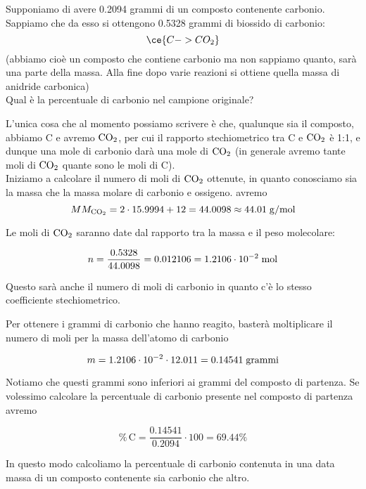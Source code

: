 \begin{esercizio}[$\bigstar$]
    Supponiamo di avere 0.2094 grammi di un composto contenente carbonio. Sappiamo che da esso si ottengono 0.5328 grammi di biossido di carbonio:
    \begin{equation*}
        \ce{C -> CO_2}
    \end{equation*}
    (abbiamo cioè un composto che contiene carbonio ma non sappiamo quanto, sarà una parte della massa. Alla fine dopo varie reazioni si ottiene quella massa di anidride carbonica)\\
    Qual è la percentuale di carbonio nel campione originale?
\end{esercizio}
\begin{soluzione}
    L'unica cosa che al momento possiamo scrivere è che, qualunque sia il composto, abbiamo C e avremo $\rm CO_2$, per cui il rapporto stechiometrico tra C e $\rm CO_2$ è 1:1, e dunque una mole di carbonio darà una mole di $\rm CO_2$ (in generale avremo tante moli di $\rm CO_2$ quante sono le moli di C).\\
    Iniziamo a calcolare il numero di moli di $\rm CO_2$ ottenute, in quanto conosciamo sia la massa che la massa molare di carbonio e ossigeno. avremo
    \begin{equation*}
        MM_{\text{CO}_2}=2 \cdot 15.9994 + 12 = 44.0098 \approx 44.01 \; \rm g/mol
    \end{equation*}

Le moli di $\rm CO_2$ saranno date dal rapporto tra la massa e il peso molecolare:

$$n=\frac{0.5328}{44.0098}=0.012106=1.2106 \cdot 10^{-2} \; \rm mol$$

Questo sarà anche il numero di moli di carbonio in quanto c'è lo stesso coefficiente stechiometrico.

Per ottenere i grammi di carbonio che hanno reagito, basterà moltiplicare il numero di moli per la massa dell'atomo di carbonio

$$m=1.2106 \cdot 10^{-2} \cdot 12.011=0.14541 \; \rm grammi$$

Notiamo che questi grammi sono inferiori ai grammi del composto di partenza. Se volessimo calcolare la percentuale di carbonio presente nel composto di partenza avremo

$$\%\,\text{C}=\frac{0.14541}{0.2094}\cdot 100 = 69.44 \%$$

In questo modo calcoliamo la percentuale di carbonio contenuta in una data massa di un composto contenente sia carbonio che altro.
\end{soluzione}

